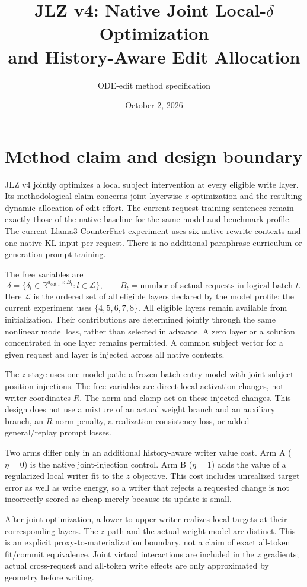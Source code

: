 \documentclass[11pt]{article}
\title{JLZ v4: Native Joint Local-$\delta$ Optimization\\
and History-Aware Edit Allocation}
\author{ODE-edit method specification}
\date{October 2, 2026}
\newcommand{\Lset}{\mathcal L}
\newcommand{\R}{\mathbb R}
\begin{document}
\maketitle

\section{Method claim and design boundary}

JLZ v4 jointly optimizes a local subject intervention at every eligible
write layer. Its methodological claim concerns joint layerwise $z$
optimization and the resulting dynamic allocation of edit effort. The
current-request training sentences remain exactly those of the native
baseline for the same model and benchmark profile. The current Llama3
CounterFact experiment uses six native rewrite contexts and one native KL
input per request. There is no additional paraphrase curriculum or
generation-prompt training.

The free variables are
\[
 \delta=\{\delta_l\in\R^{d_{\mathrm{out},l}\times B_t}:l\in\Lset\},
 \qquad B_t=\text{number of actual requests in logical batch }t.
\]
Here $\Lset$ is the ordered set of all eligible layers declared by the model
profile; the current experiment uses $\{4,5,6,7,8\}$. All eligible layers
remain available from initialization. Their contributions are
determined jointly through the same nonlinear model loss, rather than
selected in advance. A zero layer or a solution concentrated in one layer
remains permitted. A common subject vector for a given request and layer
is injected across all native contexts.

The $z$ stage uses one model path: a frozen batch-entry model with joint
subject-position injections. The free variables are direct local
activation changes, not writer coordinates $R$. The norm and clamp act on
these injected changes. This design does not use a mixture of an actual
weight branch and an auxiliary branch, an $R$-norm penalty, a realization
consistency loss, or added general/replay prompt losses.

Two arms differ only in an additional history-aware writer value cost.
Arm A ($\eta=0$) is the native joint-injection control. Arm B ($\eta=1$)
adds the value of a regularized local writer fit to the $z$ objective. This
cost includes unrealized target error as well as write energy, so a writer
that rejects a requested change is not incorrectly scored as cheap merely
because its update is small.

After joint optimization, a lower-to-upper writer realizes local targets
at their corresponding layers. The $z$ path and the actual weight model
are distinct. This is an explicit proxy-to-materialization boundary, not
a claim of exact all-token fit/commit equivalence. Joint virtual
interactions are included in the $z$ gradients; actual cross-request and
all-token write effects are only approximated by geometry before writing.
\end{document}
